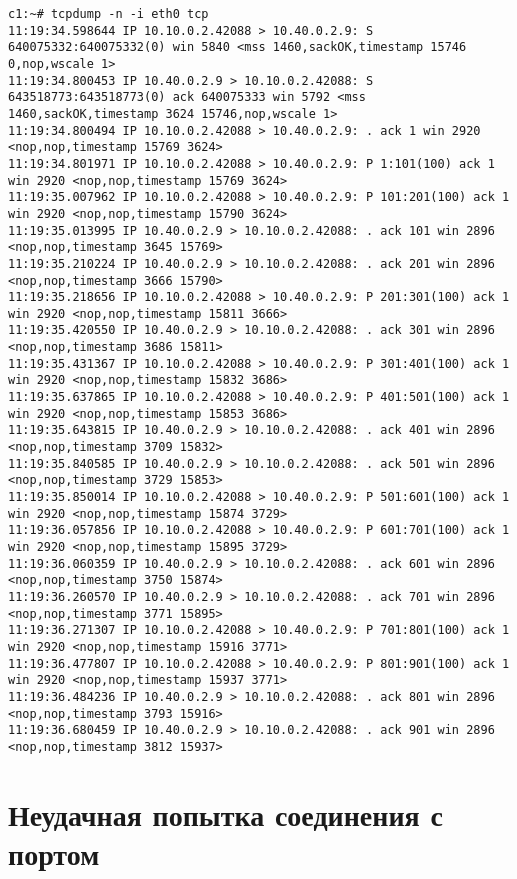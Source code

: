 \documentclass[a4paper,12pt]{article}
\begin{document}
\begin{Verbatim}
c1:~# tcpdump -n -i eth0 tcp
11:19:34.598644 IP 10.10.0.2.42088 > 10.40.0.2.9: S 640075332:640075332(0) win 5840 <mss 1460,sackOK,timestamp 15746 0,nop,wscale 1>
11:19:34.800453 IP 10.40.0.2.9 > 10.10.0.2.42088: S 643518773:643518773(0) ack 640075333 win 5792 <mss 1460,sackOK,timestamp 3624 15746,nop,wscale 1>
11:19:34.800494 IP 10.10.0.2.42088 > 10.40.0.2.9: . ack 1 win 2920 <nop,nop,timestamp 15769 3624>
11:19:34.801971 IP 10.10.0.2.42088 > 10.40.0.2.9: P 1:101(100) ack 1 win 2920 <nop,nop,timestamp 15769 3624>
11:19:35.007962 IP 10.10.0.2.42088 > 10.40.0.2.9: P 101:201(100) ack 1 win 2920 <nop,nop,timestamp 15790 3624>
11:19:35.013995 IP 10.40.0.2.9 > 10.10.0.2.42088: . ack 101 win 2896 <nop,nop,timestamp 3645 15769>
11:19:35.210224 IP 10.40.0.2.9 > 10.10.0.2.42088: . ack 201 win 2896 <nop,nop,timestamp 3666 15790>
11:19:35.218656 IP 10.10.0.2.42088 > 10.40.0.2.9: P 201:301(100) ack 1 win 2920 <nop,nop,timestamp 15811 3666>
11:19:35.420550 IP 10.40.0.2.9 > 10.10.0.2.42088: . ack 301 win 2896 <nop,nop,timestamp 3686 15811>
11:19:35.431367 IP 10.10.0.2.42088 > 10.40.0.2.9: P 301:401(100) ack 1 win 2920 <nop,nop,timestamp 15832 3686>
11:19:35.637865 IP 10.10.0.2.42088 > 10.40.0.2.9: P 401:501(100) ack 1 win 2920 <nop,nop,timestamp 15853 3686>
11:19:35.643815 IP 10.40.0.2.9 > 10.10.0.2.42088: . ack 401 win 2896 <nop,nop,timestamp 3709 15832>
11:19:35.840585 IP 10.40.0.2.9 > 10.10.0.2.42088: . ack 501 win 2896 <nop,nop,timestamp 3729 15853>
11:19:35.850014 IP 10.10.0.2.42088 > 10.40.0.2.9: P 501:601(100) ack 1 win 2920 <nop,nop,timestamp 15874 3729>
11:19:36.057856 IP 10.10.0.2.42088 > 10.40.0.2.9: P 601:701(100) ack 1 win 2920 <nop,nop,timestamp 15895 3729>
11:19:36.060359 IP 10.40.0.2.9 > 10.10.0.2.42088: . ack 601 win 2896 <nop,nop,timestamp 3750 15874>
11:19:36.260570 IP 10.40.0.2.9 > 10.10.0.2.42088: . ack 701 win 2896 <nop,nop,timestamp 3771 15895>
11:19:36.271307 IP 10.10.0.2.42088 > 10.40.0.2.9: P 701:801(100) ack 1 win 2920 <nop,nop,timestamp 15916 3771>
11:19:36.477807 IP 10.10.0.2.42088 > 10.40.0.2.9: P 801:901(100) ack 1 win 2920 <nop,nop,timestamp 15937 3771>
11:19:36.484236 IP 10.40.0.2.9 > 10.10.0.2.42088: . ack 801 win 2896 <nop,nop,timestamp 3793 15916>
11:19:36.680459 IP 10.40.0.2.9 > 10.10.0.2.42088: . ack 901 win 2896 <nop,nop,timestamp 3812 15937>
\end{Verbatim}

\section{Неудачная попытка соединения с портом}
\end{document}
